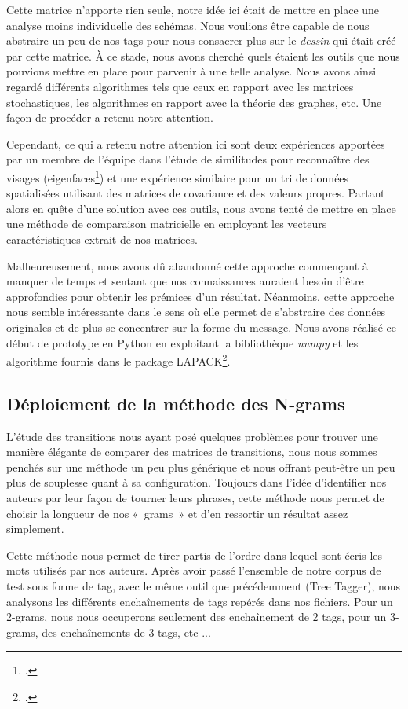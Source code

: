 \documentclass[a4paper,12pt]{report}
\begin{document}
Cette matrice n'apporte rien seule, notre idée ici était de mettre en place une analyse moins individuelle des schémas. Nous voulions être capable de nous abstraire un peu de nos tags pour nous consacrer plus sur le \textit{dessin} qui était créé par cette matrice. À ce stade, nous avons cherché quels étaient les outils que nous pouvions mettre en place pour parvenir à une telle analyse. Nous avons ainsi regardé différents algorithmes tels que ceux en rapport avec les matrices stochastiques, les algorithmes en rapport avec la théorie des graphes, etc. Une façon de procéder a retenu notre attention.

Cependant, ce qui a retenu notre attention ici sont deux expériences apportées par un membre de l'équipe dans l'étude de similitudes pour reconnaître des visages (eigenfaces\footcite{http://fr.wikipedia.org/wiki/Eigenface}) et une expérience similaire pour un tri de données spatialisées utilisant des matrices de covariance et des valeurs propres. Partant alors en quête d'une solution avec ces outils, nous avons tenté de mettre en place une méthode de comparaison matricielle en employant les vecteurs caractéristiques extrait de nos matrices.

Malheureusement, nous avons dû abandonné cette approche commençant à manquer de temps et sentant que nos connaissances auraient besoin d'être approfondies pour obtenir les prémices d'un résultat. Néanmoins, cette approche nous semble intéressante dans le sens où elle permet de s'abstraire des données originales et de plus se concentrer sur la forme du message. Nous avons réalisé ce début de prototype en Python en exploitant la bibliothèque \textit{numpy} et les algorithme fournis dans le package LAPACK\footcite{http://www.netlib.org/lapack/}.

\subsection{Déploiement de la méthode des N-grams}

L'étude des transitions nous ayant posé quelques problèmes pour trouver une manière élégante de comparer des matrices de transitions, nous nous sommes penchés sur une méthode un peu plus générique et nous offrant peut-être un peu plus de souplesse quant à sa configuration. Toujours dans l'idée d'identifier nos auteurs par leur façon de tourner leurs phrases, cette méthode nous permet de choisir la longueur de nos «~grams~» et d'en ressortir un résultat assez simplement.

Cette méthode nous permet de tirer partis de l'ordre dans lequel sont écris les mots utilisés par nos auteurs. Après avoir passé l'ensemble de notre corpus de test sous forme de tag, avec le même outil que précédemment (Tree Tagger), nous analysons les différents enchaînements de tags repérés dans nos fichiers. Pour un 2-grams, nous nous occuperons seulement des enchaînement de 2 tags, pour un 3-grams, des enchaînements de 3 tags, etc ...
\end{document}
